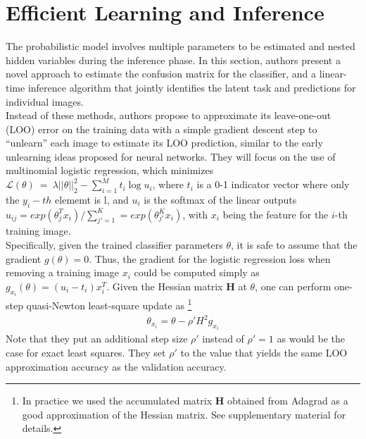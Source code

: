 \documentclass[10pt,twocolumn,letterpaper]{article}
\begin{document}
\section{Efficient Learning and Inference}
The probabilistic model involves multiple parameters to be estimated and nested hidden variables during the inference phase. In this section, authors present a novel approach to estimate the confusion matrix for the classifier, and a linear-time inference algorithm that jointly identifies the latent task and predictions for individual images.\\
\indent Instead of these methods, authors propose to approximate its leave-one-out (LOO) error on the training data with a simple gradient descent step to ``unlearn'' each image to estimate its LOO prediction, similar to the early unlearning ideas \cite{Word} proposed for neural networks. They will focus on the use of multinomial logistic regression, which minimizes $\mathcal{L}(\theta)~=~\lambda||\theta||_2^2-\sum_{i=1}^M t_i \log u_i$, where $t_i$ is a 0-1 indicator vector where only the $y_i-th$ elememt is l, and $u_i$ is the softmax of the linear outputs $u_{ij}=exp(\theta_j^Tx_i)/\sum_{j'=1}^K=exp(\theta_{j'}^Kx_i)$, with $x_i$ being the feature for the $i$-th training image.\\
\indent Specifically, given the trained classifier parameters $\theta$, it is safe to assume that the gradient $g(\theta) = 0$. Thus, the gradient for the logistic regression loss when removing a training image $x_i$ could be computed simply as $g_{x_i}(\theta) = (u_i - t_i)x_i^T$. Given the Hessian matrix {\bf H} at $\theta$, one can perform one-step quasi-Newton least-square update as \footnote{In practice we used the accumulated matrix {\bf H} obtained from Adagrad \cite{Learning} as a good approximation of the Hessian matrix. See supplementary material for details.}\\
\begin{gather*}
\theta_{x_i} = \theta - \rho' H^2 g_{x_i} \tag{5}
\end{gather*}
Note that they put an additional step size $\rho'$ instead of $\rho' = 1$ as would be the case for exact least squares. They set $\rho'$ to the value that yields the same LOO approximation accuracy as the validation accuracy. \\
\balance
\end{document}
